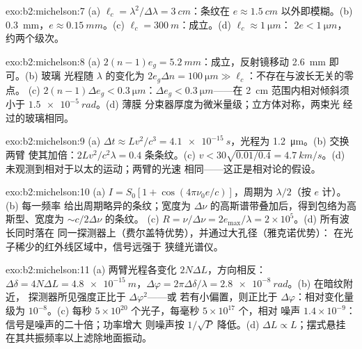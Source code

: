 \begin{solution}{exo:b2:michelson:7}
(a) $\ell_c = \lambda^2/\Delta\lambda = \qty{3}{cm}$：条纹在 $e \approx \qty{1.5}{cm}$ 以外即模糊。(b)
\qty{0.3}{mm}，$e \approx \qty{0.15}{mm}$。(c) $\ell_c = \qty{300}{m}$：成立。(d) $\ell_c \approx \qty{1}{\micro m}$：
$2e < \qty{1}{\micro m}$，约两个级次。
\end{solution}

\begin{solution}{exo:b2:michelson:8}
(a) $2(n - 1)e_g = \qty{5.2}{mm}$：成立，反射镜移动 \qty{2.6}{mm} 即可。(b) 玻璃
光程随 $\lambda$ 的变化为 $2e_g\Delta n = \qty{100}{\micro m} \gg \ell_c$：不存在与波长无关的零点。
(c) $2(n - 1)\Delta e_g < \qty{0.3}{\micro m}$：$\Delta e_g <
\qty{0.3}{\micro m}$——在 \qty{2}{cm} 范围内相对倾斜须小于 $\qty{1.5e-5}{rad}$。(d) 薄膜
分束器厚度为微米量级；立方体对称，两束光
经过的玻璃相同。
\end{solution}

\begin{solution}{exo:b2:michelson:9}
(a) $\Delta t \approx Lv^2/c^3 = \qty{4.1e-15}{s}$，光程为 \qty{1.2}{\micro m}。(b) 交换两臂
使其加倍：$2Lv^2/c^2\lambda = 0.4$ 条条纹。(c) $v < 30\sqrt{0.01/0.4} =
\qty{4.7}{km/s}$。(d) 未观测到相对于以太的运动；两臂的光速
相同——这正是相对论的假设。
\end{solution}

\begin{solution}{exo:b2:michelson:10}
(a) $I = S_0[1 + \cos(4\pi\nu_0e/c)]$，周期为 $\lambda/2$（按 $e$ 计）。(b) 每一频率
给出周期略异的条纹；宽度为
$\Delta\nu$ 的高斯谱带叠加后，得到包络为高斯型、宽度为 $\sim c/2\Delta\nu$ 的条纹。
(c) $R = \nu/\Delta\nu = 2e_{\max}/\lambda = 2 \times 10^5$。(d) 所有波长同时落在
同一探测器上（费尔盖特优势），并通过大孔径（雅克诺优势）：
在光子稀少的红外线区域中，信号远强于
狭缝光谱仪。
\end{solution}

\begin{solution}{exo:b2:michelson:11}
(a) 两臂光程各变化 $2N\Delta L$，方向相反：$\Delta\delta = 4N\Delta L
= \qty{4.8e-15}{m}$，$\Delta\varphi = 2\pi\Delta\delta/\lambda = \qty{2.8e-8}{rad}$。(b) 在暗纹附近，
探测器所见强度正比于 $\Delta\varphi^2$——或
若有小偏置，则正比于 $\Delta\varphi$：相对变化量级为 $10^{-8}$。(c)
每秒 $5 \times 10^{20}$ 个光子，每毫秒 $5 \times 10^{17}$ 个，相对
噪声 $1.4 \times 10^{-9}$：信号是噪声的二十倍；功率增大
则噪声按 $1/\sqrt P$ 降低。(d) $\Delta L \propto L$；摆式悬挂
在其共振频率以上滤除地面振动。
\end{solution}

